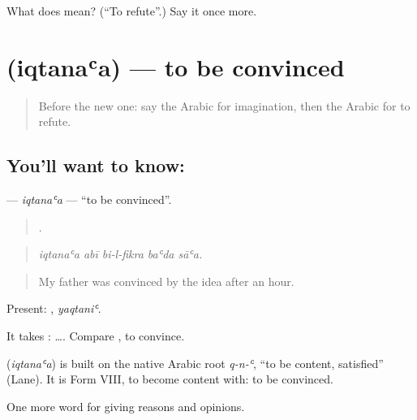 \begin{tcolorbox}[breakable,colback=teal!4,colframe=teal!35!black,title={Before you move on}]
What does  mean? (\textquotedblleft{}To refute\textquotedblright{}.) Say it once more.
\end{tcolorbox}
\section[\texorpdfstring{\ar{اقتنع} (iqtanaʿa)}{اقتنع (iqtanaʿa)}]{ (iqtanaʿa) — to be convinced}

\label{lesson:AR-C365-iqtanaa}



\begin{quote}
Before the new one: say the Arabic for imagination, then the Arabic for to refute.
\end{quote}

\subsection*{You'll want to know: }
\textbf{} — \emph{iqtanaʿa} — \textquotedblleft{}to be convinced\textquotedblright{}.

\begin{quote}
    .
\end{quote}

\begin{quote}
\emph{iqtanaʿa abī bi-l-fikra baʿda sāʿa.}
\end{quote}

\begin{quote}
My father was convinced by the idea after an hour.
\end{quote}

Present: , \emph{yaqtaniʿ}.

It takes :   …. Compare , to convince.

\begin{cousinweb}
\textbf{} (\emph{iqtanaʿa}) is built on the native Arabic root \emph{q-n-ʿ}, \textquotedblleft{}to be content, satisfied\textquotedblright{} (Lane). It is Form VIII, to become content with: to be convinced.
\end{cousinweb}

\begin{grammarlens}[title={What you've built}]
One more word for giving reasons and opinions.
\end{grammarlens}

